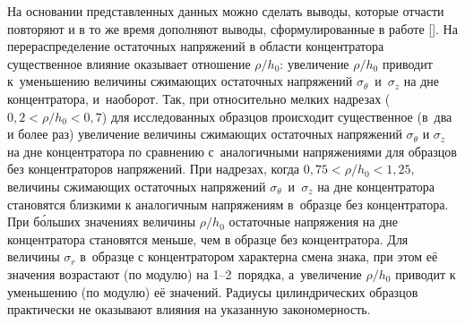 На основании представленных   данных можно сделать выводы, которые отчасти повторяют и в то же время дополняют выводы, сформулированные в работе [].
На перераспределение остаточных напряжений в области концентратора существенное влияние оказывает отношение
 $\rho/h_0$: увеличение $\rho/h_0$ приводит к~уменьшению величины сжимающих остаточных напряжений $\sigma_\theta$~и~$\sigma_z$ на дне концентратора, и~наоборот.
Так, при относительно мелких надрезах ($0,2<\rho/h_0 <0,7$) для исследованных образцов происходит существенное (в~два и более раз) увеличение величины сжимающих остаточных напряжений $\sigma_\theta$ и $\sigma_z$ на дне концентратора по сравнению с~аналогичными напряжениями для образцов без концентраторов напряжений. 
При надрезах, когда $0,75<\rho/h_0 <1,25$,  величины сжимающих остаточных напряжений $\sigma_\theta$~и~$\sigma_z$ на дне концентратора становятся близкими к аналогичным напряжениям в~образце без концентратора. 
При б\'ольших значениях величины $\rho/h_0$ остаточные напряжения на дне концентратора становятся меньше, чем в образце без концентратора. 
Для величины $\sigma_r$ в~образце с  концентратором характерна смена знака,  при этом её значения возрастают (по модулю) на \mbox{1--2}~порядка, а~увеличение $\rho/h_0$ приводит к уменьшению (по модулю) её значений.
Радиусы цилиндрических образцов практически не оказывают влияния на указанную закономерность.




